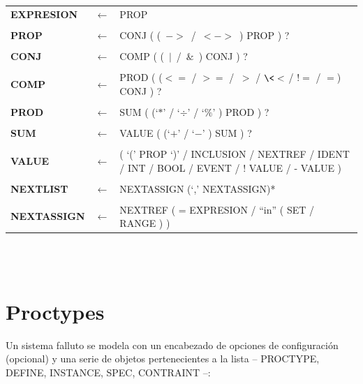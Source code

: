 \documentclass[pdftex,a4paper,12pt]{book}
\begin{document}
\begin{tabularx}{\textwidth}{>{\bfseries}llX }

EXPRESION & $\longleftarrow$ & PROP\\\\
PROP & $\longleftarrow$ & CONJ ( (~$->$~/~$<->$~) PROP ) ?\\\\
CONJ & $\longleftarrow$ & COMP ( (~$|$~/~$\&$~) CONJ ) ?\\\\
COMP & $\longleftarrow$ & PROD ( ($<=$ / $>=$ / $\>>$ / $\<<$ / $!=$ / $=$) CONJ ) ?\\\\
PROD & $\longleftarrow$ & SUM ( (`$*$' / `$\div$' / `$\%$' ) PROD ) ?\\\\
SUM & $\longleftarrow$ & VALUE ( (`$+$' / `$-$' ) SUM ) ?\\\\
VALUE & $\longleftarrow$  & ( `(' PROP `)' / INCLUSION / NEXTREF / IDENT / INT / BOOL / EVENT / ! VALUE / - VALUE ) \\\\
NEXTLIST & $\longleftarrow$  & NEXTASSIGN (`,' NEXTASSIGN)*\\\\
NEXTASSIGN & $\longleftarrow$  & NEXTREF ( = EXPRESION / ``in'' ( SET / RANGE ) )\\
\end{tabularx}
~\\\\




\section*{Proctypes}
Un sistema falluto se modela con un encabezado de opciones de configuraci\'on (opcional) y una serie de objetos pertenecientes a la lista -- PROCTYPE, DEFINE, INSTANCE, SPEC, CONTRAINT --:\\\\
\end{document}
